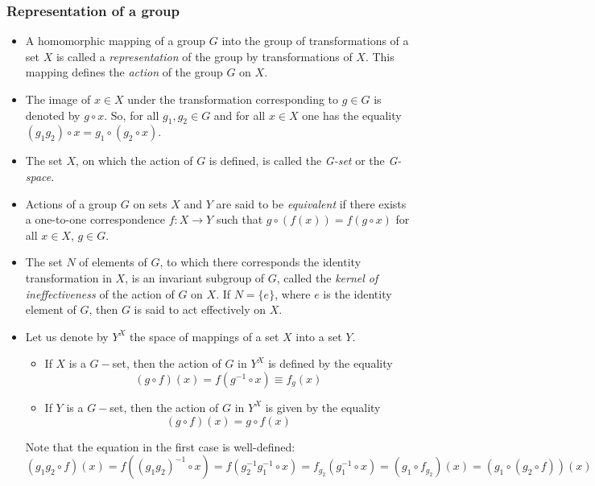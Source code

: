 \subsubsection{Representation of a group}
\begin{itemize}
	\item A homomorphic mapping of a group $G$ into the group of transformations of
	a set $X$ is called a \emph{representation} of the group by transformations of $X$. This mapping defines the \emph{action} of the group $G$ on $X$.
	\item The image of $x\in X$ under the transformation corresponding to $g\in G$ is denoted by $g\circ x$. So, for all $g_1,g_2 \in G$
	and for all $x \in X$ one has the equality $(g_1g_2)\circ x=g_1\circ (g_2\circ x)$.
	\item The set $X$, on which the action of $G$ is defined, is called the \emph{G-set} or the \emph{G-space}.
	\item Actions of a group $G$ on sets $X$ and $Y$ are said to be \emph{equivalent} if there exists a one-to-one correspondence $f:X\rightarrow Y$ such that $g\circ(f(x))=f(g\circ x)$ for all $x\in X$, $g\in G$.
	\item The set $N$ of elements of $G$, to which there corresponds the identity transformation in $X$, is an invariant subgroup of $G$, called the \emph{kernel of ineffectiveness} of the action of $G$ on $X$. If $N = \{e\}$, where $e$ is the identity element of $G$, then $G$ is said to act effectively on $X$.
	\item Let us denote by $Y^X$ the space of mappings of a set $X$ into a set $Y$.
	\begin{itemize}
		\item  If $X$ is a $G-$set, then the action of $G$ in $Y^X$ is defined by the equality $$(g\circ f)(x)=f(g^{-1}\circ x)\equiv f_g(x)$$
		\item If $Y$ is a $G-$set, then the action of $G$ in $Y^X$ is given by the equality $$(g\circ f)(x)=g\circ f(x)$$
	\end{itemize}
	Note that the equation in the first case is well-defined: $$(g_1g_2\circ f)(x)=f((g_1g_2)^{-1}\circ x)=f(g_2^{-1}g_1^{-1}\circ x)=f_{g_2}(g_1^{-1}\circ x)=(g_1\circ f_{g_2})(x)=(g_1\circ (g_2\circ f))(x)$$
	
\end{itemize}
